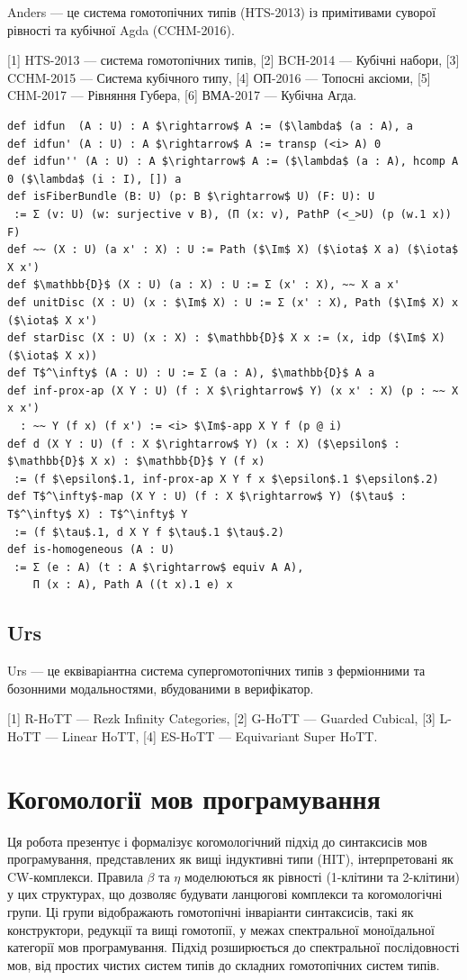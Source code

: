 Anders — це система гомотопічних типів (HTS-2013) із примітивами суворої рівності та кубічної Agda (CCHM-2016).

[1] HTS-2013 — система гомотопічних типів,
[2] BCH-2014 — Кубічні набори,
[3] CCHM-2015 — Система кубічного типу,
[4] ОП-2016 — Топосні аксіоми,
[5] CHM-2017 — Рівняння Губера,
[6] ВМА-2017 — Кубічна Агда.

\begin{lstlisting}[mathescape=true]
def idfun  (A : U) : A $\rightarrow$ A := ($\lambda$ (a : A), a
def idfun' (A : U) : A $\rightarrow$ A := transp (<i> A) 0
def idfun'' (A : U) : A $\rightarrow$ A := ($\lambda$ (a : A), hcomp A 0 ($\lambda$ (i : I), []) a
def isFiberBundle (B: U) (p: B $\rightarrow$ U) (F: U): U
 := Σ (v: U) (w: surjective v B), (Π (x: v), PathP (<_>U) (p (w.1 x)) F)
def ~~ (X : U) (a x' : X) : U := Path ($\Im$ X) ($\iota$ X a) ($\iota$ X x')
def $\mathbb{D}$ (X : U) (a : X) : U := Σ (x' : X), ~~ X a x'
def unitDisc (X : U) (x : $\Im$ X) : U := Σ (x' : X), Path ($\Im$ X) x ($\iota$ X x')
def starDisc (X : U) (x : X) : $\mathbb{D}$ X x := (x, idp ($\Im$ X) ($\iota$ X x))
def T$^\infty$ (A : U) : U := Σ (a : A), $\mathbb{D}$ A a
def inf-prox-ap (X Y : U) (f : X $\rightarrow$ Y) (x x' : X) (p : ~~ X x x')
  : ~~ Y (f x) (f x') := <i> $\Im$-app X Y f (p @ i)
def d (X Y : U) (f : X $\rightarrow$ Y) (x : X) ($\epsilon$ : $\mathbb{D}$ X x) : $\mathbb{D}$ Y (f x)
 := (f $\epsilon$.1, inf-prox-ap X Y f x $\epsilon$.1 $\epsilon$.2)
def T$^\infty$-map (X Y : U) (f : X $\rightarrow$ Y) ($\tau$ : T$^\infty$ X) : T$^\infty$ Y
 := (f $\tau$.1, d X Y f $\tau$.1 $\tau$.2)
def is-homogeneous (A : U)
 := Σ (e : A) (t : A $\rightarrow$ equiv A A),
    Π (x : A), Path A ((t x).1 e) x
\end{lstlisting}

\subsection*{Urs}

Urs — це еквіваріантна система супергомотопічних типів з ферміонними та бозонними модальностями,
вбудованими в верифікатор.

[1] R-HoTT — Rezk Infinity Categories,
[2] G-HoTT — Guarded Cubical,
[3] L-HoTT — Linear HoTT,
[4] ES-HoTT — Equivariant Super HoTT.

\section{Когомології мов програмування}
Ця робота презентує і формалізує когомологічний підхід до синтаксисів мов програмування,
представлених як вищі індуктивні типи (HIT), інтерпретовані як CW-комплекси.
Правила $\beta$ та $\eta$ моделюються як рівності (1-клітини та 2-клітини)
у цих структурах, що дозволяє будувати ланцюгові комплекси та когомологічні групи.
Ці групи відображають гомотопічні інваріанти синтаксисів, такі як конструктори,
редукції та вищі гомотопії, у межах спектральної моноїдальної категорії мов програмування.
Підхід розширюється до спектральної послідовності мов, від простих чистих систем типів
до складних гомотопічних систем типів.

